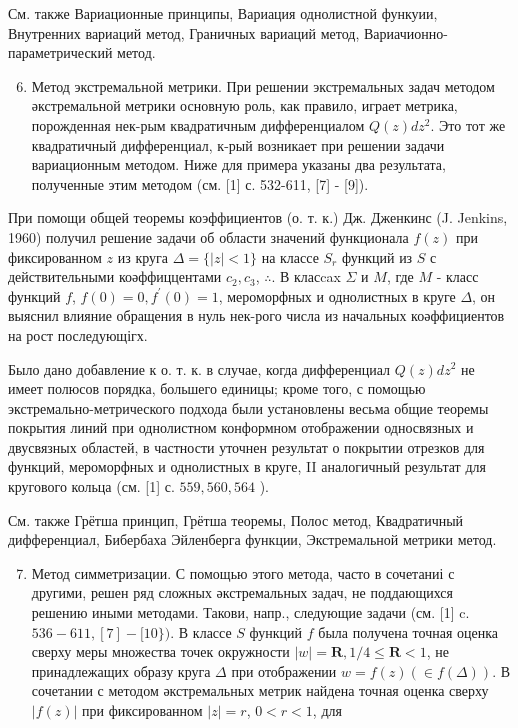 \documentclass[10pt]{article}
\begin{document}
См. также Вариационные принципы, Вариация однолистной функуии, Внутренних вариаций метод, Граничных вариаций метод, Вариачионно-параметрический метод.



\begin{enumerate}

  \setcounter{enumi}{5}

  \item Метод экстремальной метрики. При решении экстремальных задач методом әкстремальной метрики основную роль, как правило, играет метрика, порожденная нек-рым квадратичным дифференциалом $Q(z) d z^{2}$. Это тот же квадратичный дифференциал, к-рый возникает при решении задачи вариационным методом. Ниже для примера указаны два результата, полученные этим методом (см. [1] с. 532-611, [7] - [9]).

\end{enumerate}



При помощи общей теоремы коэффициентов (о. т. к.) Дж. Дженкинс (J. Jenkins, 1960) получил решение задачи об области значений функционала $f(z)$ при фиксированном $z$ из круга $\Delta=\{|z|<1\}$ на классе $S_{r}$ функций из $S$ с действительными коәффиццентами $c_{2}, c_{3}$, $\therefore$. В класcax $\Sigma$ и $M$, где $M$ - класс функций $f$, $f(0)=0, f^{\prime}(0)=1$, мероморфных и однолистных в круге $\Delta$, он выяснил влияние обращения в нуль нек-рого числа из начальных коәффициентов на рост последующігх.



Было дано добавление к о. т. к. в случае, когда дифференциал $Q(z) d z^{2}$ не имеет полюсов порядка, большего единицы; кроме того, с помощью экстремально-метрического подхода были установлены весьма общие теоремы покрытия линий при однолистном конформном отображении односвязных и двусвязных областей, в частности уточнен результат о покрытии отрезков для функций, мероморфных и однолистных в круге, II аналогичный результат для кругового кольца (см. [1] с. $559,560,564$ ).



См. также Грётша принцип, Грётша теоремы, Полос метод, Квадратичный дифференциал, Бибербаха Эйленберга функции, Экстремальной метрики метод.



\begin{enumerate}

  \setcounter{enumi}{6}

  \item Метод симметризации. С помощью этого метода, часто в сочетаниі с другими, решен ряд сложных әкстремальных задач, не поддающихся решению иными методами. Такови, напр., следующие задачи (см. [1] c. $536-611,[7]-[10\})$. В классе $S$ функций $f$ была получена точная оценка сверху меры множества точек окружности $|w|=\boldsymbol{R}, 1 / 4 \leqslant \boldsymbol{R}<1$, не принадлежащих образу круга $\Delta$ при отображении $w=f(z)(\in f(\Delta))$. В сочетании с методом әкстремальных метрик найдена точная оценка сверху $|f(z)|$ при фиксированном $|z|=r$, $0<r<1$, для

\end{enumerate}
\end{document}
